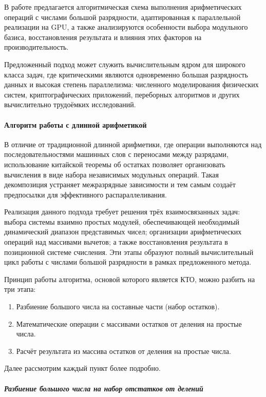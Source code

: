 \documentclass{crm-article}
\begin{document}
В работе предлагается алгоритмическая схема выполнения арифметических операций с числами большой разрядности, адаптированная к параллельной реализации на GPU, а также анализируются особенности выбора модульного базиса, восстановления результата и влияния этих факторов на производительность.

Предложенный подход может служить вычислительным ядром для широкого класса задач, где критическими являются одновременно большая разрядность данных и высокая степень параллелизма: численного моделирования физических систем, криптографических приложений, переборных алгоритмов и других вычислительно трудоёмких исследований.

\paragraph{Алгоритм работы с длинной арифметикой} 

В отличие от традиционной длинной арифметики, где операции выполняются над последовательностями машинных слов с переносами между разрядами, использование китайской теоремы об остатках позволяет организовать вычисления в виде набора независимых модульных операций. Такая декомпозиция устраняет межразрядные зависимости и тем самым создаёт предпосылки для эффективного распараллеливания.

Реализация данного подхода требует решения трёх взаимосвязанных задач: выбора системы взаимно простых модулей, обеспечивающей необходимый динамический диапазон представимых чисел; организации арифметических операций над массивами вычетов; а также восстановления результата в позиционной системе счисления. Эти этапы образуют полный вычислительный цикл работы с числами большой разрядности в рамках предложенного метода.

Принцип работы алгоритма, основой которого является КТО, можно разбить на три этапа: 

\begin{enumerate}
	\item Разбиение большого числа на составные части (набор остатков).
	\item Математические операции с массивами остатков от деления на простые числа.
	\item Расчёт результата из массива остатков от деления на простые числа.
\end{enumerate}

Далее рассмотрим каждый пункт более подробно. 


\subparagraph{Разбиение большого числа на набор отстатков от делений}
\end{document}
